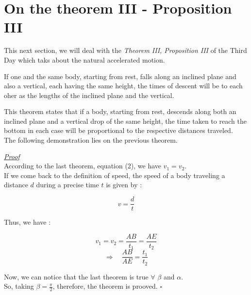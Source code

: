 \section{On the theorem III - Proposition III}
This next section, we will deal with the \textit{Theorem III, Proposition III} of the Third Day which taks about the natural accelerated motion.
\begin{theorem}
If one and the same body, starting from rest, falls along  an inclined plane and also a vertical, each having the same height, the times of descent will be to each oher as the lengths of the inclined plane and the vertical.
\end{theorem}

This theorem states that if a body, starting from rest, descends along both an inclined plane and a vertical drop of the same height, the time taken to reach the bottom in each case will be proportional to the respective distances traveled.\\

The following demonstration lies on the previous theorem.

\underline{\textit{Proof}}\\

According to the last theorem, equation (2), we have $v_1 = v_2$.\\

If we come back to the definition of speed, the speed of a body traveling a distance $d$ during a precise time $t$ is given by :

\[v = \frac{d}{t} \]

Thus, we have :

\[v_1 = v_2 = \frac{AB}{t_1} = \frac{AE}{t_2} \]
\[\Longrightarrow	\quad	\frac{AB}{AE} = \frac{t_1}{t_2} \]

Now, we can notice that the last theorem is true $\forall$ $\beta$ and $\alpha$.\\

So, taking $\beta = \frac{\pi}{2}$, therefore, the theorem is prooved.
\hfill $\square$